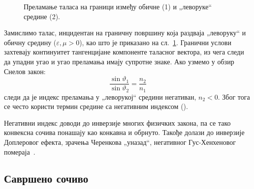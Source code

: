 \documentclass[main.tex]{subfiles}
\begin{document}
\begin{figure}[h]
    \centering
    \caption{Преламање таласа на граници између обичне (1) и „леворуке`` средине (2).}
    \label{uvod:negrefr}
\end{figure}
Замислимо талас, инцидентан на граничну површину која раздваја „леворуку`` и обичну средину ($\varepsilon,\mu > 0$), као што је приказано на сл.~\ref{uvod:negrefr}. Гранични услови захтевају континуитет тангенцијане компоненте таласног вектора, из чега следи да упадни угао и угао преламања имају супротне знаке. Ако узмемо у обзир Снелов закон:
\begin{equation}
    \frac{\sin{\vartheta_1}}{\sin{\vartheta_2}} = \frac{n_2}{n_1}
\end{equation}
следи да је индекс преламања у „леворукој`` средини негативан, $n_2<0$. Због тога се често користи термин средине са негативним индексом ().

Негативни индекс доводи до инверзије многих физичких закона, па се тако конвексна сочива понашају као конкавна и обрнуто. Такође долази до инверзије Доплеровог ефекта, зрачења Черенкова „уназад``, негативног Гус-Хенхеновог помераја~\cite{markes_knjiga}.

\subsection{Савршено сочиво}
\end{document}
